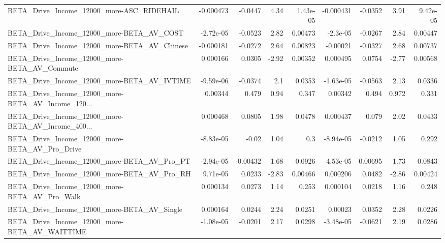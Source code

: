 \begin{tabular}{lrrrrrrrr}
BETA\_Drive\_Income\_12000\_more-ASC\_RIDEHAIL          &   -0.000473 &      -0.0447 &      4.34 & 1.43e-05 &  -0.000431 &     -0.0352 &         3.91 &      9.42e-05 \\
BETA\_Drive\_Income\_12000\_more-BETA\_AV\_COST          &   -2.72e-05 &      -0.0523 &      2.82 &  0.00473 &   -2.3e-05 &     -0.0267 &         2.84 &       0.00447 \\
BETA\_Drive\_Income\_12000\_more-BETA\_AV\_Chinese       &   -0.000181 &      -0.0272 &      2.64 &  0.00823 &   -0.00021 &     -0.0327 &         2.68 &       0.00737 \\
BETA\_Drive\_Income\_12000\_more-BETA\_AV\_Commute       &    0.000166 &       0.0305 &     -2.92 &  0.00352 &   0.000495 &      0.0754 &        -2.77 &       0.00568 \\
BETA\_Drive\_Income\_12000\_more-BETA\_AV\_IVTIME        &   -9.59e-06 &      -0.0374 &       2.1 &   0.0353 &  -1.63e-05 &     -0.0563 &         2.13 &        0.0336 \\
BETA\_Drive\_Income\_12000\_more-BETA\_AV\_Income\_120... &     0.00344 &        0.479 &      0.94 &    0.347 &    0.00342 &       0.494 &        0.972 &         0.331 \\
BETA\_Drive\_Income\_12000\_more-BETA\_AV\_Income\_400... &    0.000468 &       0.0805 &      1.98 &   0.0478 &   0.000437 &       0.079 &         2.02 &        0.0433 \\
BETA\_Drive\_Income\_12000\_more-BETA\_AV\_Pro\_Drive     &   -8.83e-05 &        -0.02 &      1.04 &      0.3 &  -8.94e-05 &     -0.0212 &         1.05 &         0.292 \\
BETA\_Drive\_Income\_12000\_more-BETA\_AV\_Pro\_PT        &   -2.94e-05 &     -0.00432 &      1.68 &   0.0926 &   4.53e-05 &     0.00695 &         1.73 &        0.0843 \\
BETA\_Drive\_Income\_12000\_more-BETA\_AV\_Pro\_RH        &    9.71e-05 &       0.0233 &     -2.83 &  0.00466 &   0.000206 &      0.0482 &        -2.86 &       0.00424 \\
BETA\_Drive\_Income\_12000\_more-BETA\_AV\_Pro\_Walk      &    0.000134 &       0.0273 &      1.14 &    0.253 &   0.000104 &      0.0218 &         1.16 &         0.248 \\
BETA\_Drive\_Income\_12000\_more-BETA\_AV\_Single        &    0.000164 &       0.0244 &      2.24 &   0.0251 &    0.00023 &      0.0352 &         2.28 &        0.0226 \\
BETA\_Drive\_Income\_12000\_more-BETA\_AV\_WAITTIME      &   -1.08e-05 &      -0.0201 &      2.17 &   0.0298 &  -3.48e-05 &     -0.0621 &         2.19 &        0.0286 \\

\end{tabular}
